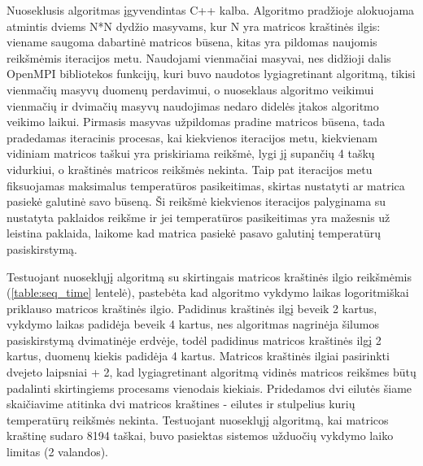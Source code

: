\documentclass{VUMIFPSbakalaurinis}
\begin{document}
Nuoseklusis algoritmas įgyvendintas C++ kalba. 
Algoritmo pradžioje alokuojama atmintis dviems N*N dydžio masyvams, kur N yra matricos kraštinės ilgis: viename saugoma dabartinė matricos būsena, kitas yra pildomas naujomis reikšmėmis iteracijos metu.
Naudojami vienmačiai masyvai, nes didžioji dalis OpenMPI bibliotekos funkcijų, kuri buvo naudotos lygiagretinant algoritmą, tikisi vienmačių masyvų duomenų perdavimui, o nuoseklaus algoritmo veikimui vienmačių ir dvimačių masyvų naudojimas nedaro didelės įtakos algoritmo veikimo laikui.
Pirmasis masyvas užpildomas pradine matricos būsena, tada pradedamas iteracinis procesas, kai kiekvienos iteracijos metu, kiekvienam vidiniam matricos taškui yra priskiriama reikšmė, lygi jį supančių 4 taškų vidurkiui, o kraštinės matricos reikšmės nekinta.
Taip pat iteracijos metu fiksuojamas maksimalus temperatūros pasikeitimas, skirtas nustatyti ar matrica pasiekė galutinė savo būseną.
Ši reikšmė kiekvienos iteracijos palyginama su nustatyta paklaidos reikšme ir jei temperatūros pasikeitimas yra mažesnis už leistina paklaida, laikome kad matrica pasiekė pasavo galutinį temperatūrų pasiskirstymą.

Testuojant nuoseklųjį algoritmą su skirtingais matricos kraštinės ilgio reikšmėmis (\ref{table:seq_time} lentelė), pastebėta kad algoritmo vykdymo laikas logoritmiškai priklauso matricos kraštinės ilgio.
Padidinus kraštinės ilgį beveik 2 kartus, vykdymo laikas padidėja beveik 4 kartus, nes algoritmas nagrinėja šilumos pasiskirstymą dvimatinėje erdvėje, todėl padidinus matricos kraštinės ilgį 2 kartus, duomenų kiekis padidėja 4 kartus.
Matricos kraštinės ilgiai pasirinkti dvejeto laipsniai + 2, kad lygiagretinant algoritmą vidinės matricos reikšmes būtų padalinti skirtingiems procesams vienodais kiekiais. 
Pridedamos dvi eilutės šiame skaičiavime atitinka dvi matricos kraštines - eilutes ir stulpelius kurių temperatūrų reikšmės nekinta.
Testuojant nuoseklųjį algoritmą, kai matricos kraštinę sudaro 8194 taškai, buvo pasiektas sistemos užduočių vykdymo laiko limitas (2 valandos).
\end{document}

